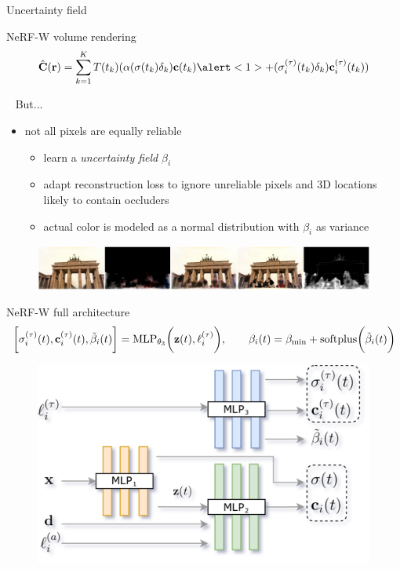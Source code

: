 \documentclass[aspectratio=1610,handout]{beamer}
\newcommand{\parenth}[2][]{#1(#2#1)}
\begin{document}
\begin{frame}{Uncertainty field}
    \begin{block}{NeRF-W volume rendering}
        \begin{equation*}
            \hat{\vb{C}}(\vb{r}) = \sum_{k = 1}^{K} T(t_k) ( \alpha (\sigma (t_k)\delta_k)  \vb{c}(t_k)  \alert<1>{+ (\sigma_i^{(\tau)} (t_k)\delta_k)  \vb{c}_i^{(\tau)}(t_k)})
        \end{equation*}
    \end{block}\
    \bigskip
    But... 
    \pause
    \begin{itemize}
        \item not all pixels are equally reliable
        \begin{itemize}
            \item learn a \emph{uncertainty field} \(\beta_i\)
            \item adapt reconstruction loss to ignore unreliable pixels and 3D locations likely to contain occluders
            \item actual color is modeled as a normal distribution with \(\beta_i\) as variance
        \end{itemize}
    \end{itemize}
    \bigskip
    \pause
    \begin{figure}[H]
        \centering
        \includegraphics[width=.75\textwidth]{render.png}
    \end{figure}
\end{frame}

\begin{frame}{NeRF-W full architecture}
    \begin{equation*}
        \bigg[\sigma_i^{(\tau)} (t), \vb{c}_i^{(\tau)} (t), \tilde{\beta}_i (t)\bigg] = \textrm{MLP}_{\theta_3} \parenth[\bigg]{\vb{z}(t), \ell_i^{(\tau)}},
        \quad\quad 
        \beta_i (t) = \beta_{\textrm{min}} + \textrm{softplus}\parenth[\bigg]{\tilde{\beta}_i (t)}
    \end{equation*}
    \begin{figure}[H]
        \centering
        \includegraphics[width=.65\textwidth,keepaspectratio]{nerfw-architecture.png}
    \end{figure}
\end{frame}
\end{document}

